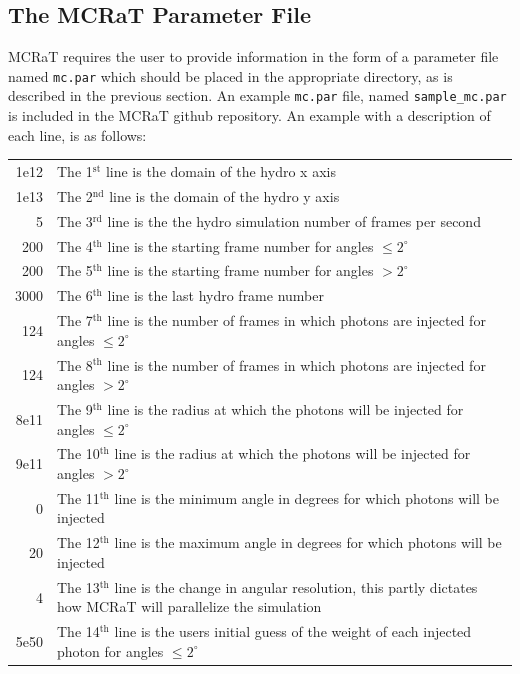 \documentclass[12pt,a4paper]{article}
\begin{document}
\subsection{The MCRaT Parameter File} \label{mc.par}
MCRaT requires the user to provide information in the form of a parameter file named \texttt{mc.par} which should be placed in the appropriate directory, as is described in the previous section. An example \texttt{mc.par} file, named \texttt{sample\_mc.par} is included in the MCRaT github repository. An example with a description of each line, is as follows:\\

\begin{tabularx}{\linewidth}{r X}
1e12 &   The 1$^\textrm{st}$ line is the domain of the hydro x axis \\ 
1e13 &   The 2$^\textrm{nd}$ line is the domain of the hydro y axis \\ 
5 &   The 3$^\textrm{rd}$ line is the the hydro simulation number of frames per second  \\ 
200 &    The 4$^\textrm{th}$ line is the starting frame number for angles $\le 2^\circ$\\ 
200 &   The 5$^\textrm{th}$ line is the starting frame number for angles $> 2^\circ$ \\ 
3000 &   The 6$^\textrm{th}$ line is the last hydro frame number \\ 
124 &    The 7$^\textrm{th}$ line is the number of frames in which photons are injected for angles $\le 2^\circ$\\ 
124 &   The 8$^\textrm{th}$ line is the number of frames in which photons are injected for angles $> 2^\circ$ \\ 
8e11 &    The 9$^\textrm{th}$ line is the radius at which the photons will be injected for angles $\le 2^\circ$\\ 
9e11 &   The 10$^\textrm{th}$ line is the radius at which the photons will be injected for angles $> 2^\circ$ \\ 
0 &   The 11$^\textrm{th}$ line is the minimum angle in degrees for which photons will be injected \\ 
20 &   The 12$^\textrm{th}$ line is the maximum angle in degrees for which photons will be injected \\ 
4 &   The 13$^\textrm{th}$ line is the change in angular resolution, this partly dictates how MCRaT will parallelize the simulation \\ 
5e50 &   The 14$^\textrm{th}$ line is the users initial guess of the weight of each injected photon for angles $\le 2^\circ$ \\ 

\end{tabularx}
\end{document}

